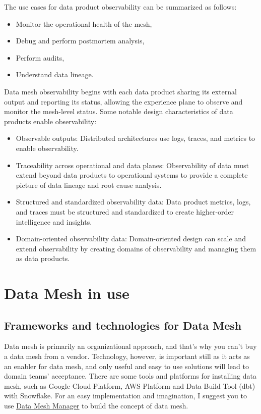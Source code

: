\documentclass[12pt, a4paper]{book}
\begin{document}
The use cases for data product observability can be summarized as follows:
	\begin{itemize}[nosep]
		\item Monitor the operational health of the mesh,
		\item Debug and perform postmortem analysis,
		\item Perform audits,
		\item Understand data lineage.
	\end{itemize}

Data mesh observability begins with each data product sharing its external output and reporting its status, allowing the experience plane to observe and monitor the mesh-level status. Some notable design characteristics of data products enable observability:
	\begin{itemize}[nosep]
		\item Observable outputs: Distributed architectures use logs, traces, and metrics to enable observability.
		\item Traceability across operational and data planes: Observability of data must extend beyond data products to operational systems to provide a complete picture of data lineage and root cause analysis.
		\item Structured and standardized observability data: Data product metrics, logs, and traces must be structured and standardized to create higher-order intelligence and insights.
		\item Domain-oriented observability data: Domain-oriented design can scale and extend observability by creating domains of observability and managing them as data products.
	\end{itemize}

\let\cleardoublepage\clearpage
\chapter{Data Mesh in use}

\section{Frameworks and technologies for Data Mesh}
Data mesh is primarily an organizational approach, and that's why you can't buy a data mesh from a vendor. Technology, however, is important still as it acts as an enabler for data mesh, and only useful and easy to use solutions will lead to domain teams' acceptance. There are some tools and platforms for installing data mesh, such as Google Cloud Platform, AWS Platform and Data Build Tool (dbt) with Snowflake. \cite{datameshweb} For an easy implementation and imagination, I suggest you to use \href{https://datamesh-manager.com/}{\underline{Data Mesh Manager}} to build the concept of data mesh.
\end{document}
